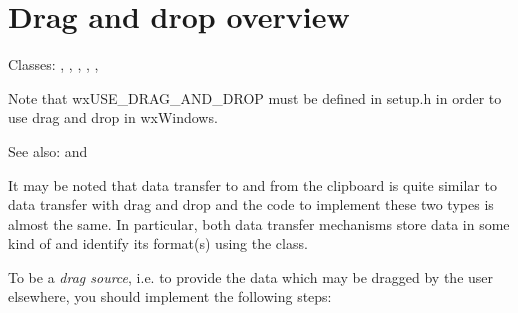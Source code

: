 \section{Drag and drop overview}\label{wxdndoverview}

Classes: , 
, 
, 
, 
, 

Note that wxUSE\_DRAG\_AND\_DROP must be defined in setup.h in order
to use drag and drop in wxWindows.

See also:  and 

It may be noted that data transfer to and from the clipboard is quite
similar to data transfer with drag and drop and the code to implement
these two types is almost the same. In particular, both data transfer
mechanisms store data in some kind of 
and identify its format(s) using the 
class.

To be a {\it drag source}, i.e. to provide the data which may be dragged by
the user elsewhere, you should implement the following steps:

